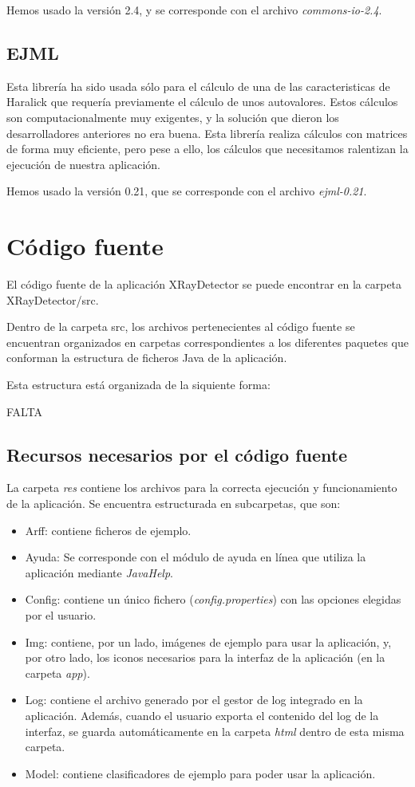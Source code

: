 Hemos usado la versión 2.4, y se corresponde con el archivo \textit{commons-io-2.4}.

\subsection{EJML}
Esta librería ha sido usada sólo para el cálculo de una de las caracteristicas de Haralick que requería previamente el cálculo de unos autovalores. Estos cálculos son computacionalmente muy exigentes, y la solución que dieron los desarrolladores anteriores no era buena. Esta librería realiza cálculos con matrices de forma muy eficiente, pero pese a ello, los cálculos que necesitamos ralentizan la ejecución de nuestra aplicación.

Hemos usado la versión 0.21, que se corresponde con el archivo \textit{ejml-0.21}.


\section{Código fuente}
El código fuente de la aplicación XRayDetector se puede encontrar en la carpeta XRayDetector/src.

Dentro de la carpeta src, los archivos pertenecientes al código fuente se encuentran organizados en carpetas correspondientes a los diferentes paquetes que conforman la estructura de ficheros Java de la aplicación.

Esta estructura está organizada de la siquiente forma:

FALTA

\subsection{Recursos necesarios por el código fuente}
La carpeta \textit{res} contiene los archivos para la correcta ejecución y funcionamiento de la aplicación. Se encuentra estructurada en subcarpetas, que son:

\begin{itemize}
\item Arff: contiene ficheros \arff{} de ejemplo.
\item Ayuda: Se corresponde con el módulo de ayuda en línea que utiliza la aplicación mediante \textit{JavaHelp}.
\item Config: contiene un único fichero (\textit{config.properties}) con las opciones elegidas por el usuario.
\item Img: contiene, por un lado, imágenes de ejemplo para usar la aplicación, y, por otro lado, los iconos necesarios para la interfaz de la aplicación (en la carpeta \textit{app}).
\item Log: contiene el archivo generado por el gestor de log integrado en la aplicación. Además, cuando el usuario exporta el contenido del log de la interfaz, se guarda automáticamente en la carpeta \textit{html} dentro de esta misma carpeta.
\item Model: contiene clasificadores de ejemplo para poder usar la aplicación.
\end{itemize}

